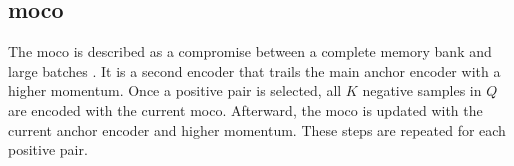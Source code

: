 \subsection{\acl{moco}}\label{subsec:MoCo}
The \ac{moco} is described as a compromise between a complete memory bank and large batches \citet{mochi_2020}.
It is a second encoder that trails the main anchor encoder with a higher momentum.
Once a positive pair is selected, all $K$ negative samples in $Q$ are encoded with the current \ac{moco}.
Afterward, the \ac{moco} is updated with the current anchor encoder and higher momentum.
These steps are repeated for each positive pair.